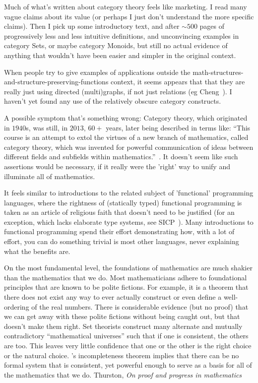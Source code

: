 \documentclass[11pt,openany]{book}
\begin{document}
Much of what's written about category theory feels like marketing.
I read many vague claims about its value
(or perhaps I just don't understand the more specific claims).
Then I pick up some introductory text,
and after ${\sim}500$ pages of progressively less and less 
intuitive definitions, and unconvincing examples in category Sets,
or maybe category Monoids,
but still no actual evidence of anything that wouldn't have been
easier and simpler in the original context.

When people try to give examples of applications outside the
math-structures-and-structure-preserving-functions context,
it seems appears that that  they are really just using directed
(multi)graphs, if not just relations (eg Cheng~\cite{Cheng:2020:Latest}).
I haven't yet found any use of the relatively obscure category 
constructs.

A possible symptom that's something wrong:
Category theory, which originated in $1940$s,
was still, in $2013$, $60+$ years, later being described in terms like:
``This course is an attempt to extol the virtues of a new branch of mathematics,
called category theory, which was invented for powerful communication of ideas between
different fields and subfields within mathematics.''~\cite{Spivak:2013:CatTheoryForScientists}.
It doesn't seem like such assertions would be necessary,
if it really were the 'right' way to unify 
and illuminate all of mathematics.

It feels similar to introductions to the related subject of
'functional' programming languages,
where the rightness of (statically typed) functional programming 
is taken as
an article of religious faith that doesn't need to be justified
(for an exception, which lacks elaborate type systems,
see SICP~\cite{AbelsonSussman:1996:SICP}).
Many introductions to functional programming spend their
effort demonstrating how, with a lot of effort, you can do
something trivial is most other languages,
never explaining what the benefits are.

\label{sec:Shaky-foundations}

\begin{boxquote}
On the most fundamental level, the foundations of mathematics are much shakier
than the mathematics that we do. Most mathematicians adhere to foundational
principles that are known to be polite fictions. For example, it is a theorem that
there does not exist any way to ever actually construct or even define a well-ordering
of the real numbers. There is considerable evidence (but no proof) that we can get
away with these polite fictions without being caught out, but that doesn’t make
them right. Set theorists construct many alternate and mutually contradictory
``mathematical universes'' such that if one is consistent, the others are too. This
leaves very little confidence that one or the other is the right choice or the natural
choice. {\Godel}’s incompleteness theorem implies that there can be no formal system
that is consistent, yet powerful enough to serve as a basis for all of the mathematics
that we do.
\tcblower
{Thurston, \emph{On proof and progress in mathematics}~\cite{Thurston:1994:Proof}}
\end{boxquote}
\end{document}
